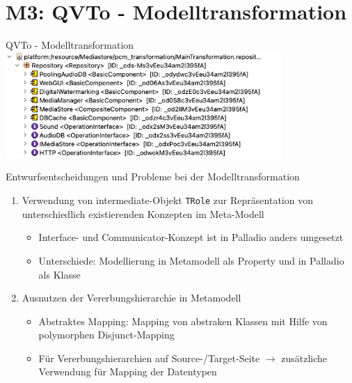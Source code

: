\section[M3: QVTo]{M3: QVTo - Modelltransformation}
\begin{frame}{QVTo - Modelltransformation}
	\centering
	\includegraphics[height=40mm]{figures/qvto.png}
\end{frame}

\begin{frame}{Entwurfsentscheidungen und Probleme bei der Modelltransformation}
	\begin{enumerate}
		\item Verwendung von intermediate-Objekt \texttt{TRole} zur Repräsentation von unterschiedlich existierenden Konzepten im Meta-Modell
		\begin{itemize}
			\item Interface- und Communicator-Konzept ist in Palladio anders umgesetzt
			\item Unterschiede: Modellierung in Metamodell als Property und in Palladio als Klasse
		\end{itemize}
		\item Ausnutzen der Vererbungshierarchie in Metamodell
		\begin{itemize}
            \item Abstraktes Mapping: Mapping von abstraken Klassen mit Hilfe von polymorphen Disjunct-Mapping
            \item Für Vererbungshierarchien auf Source-/Target-Seite $\rightarrow$ zusätzliche Verwendung für Mapping der Datentypen
        \end{itemize}
	\end{enumerate}
\end{frame}